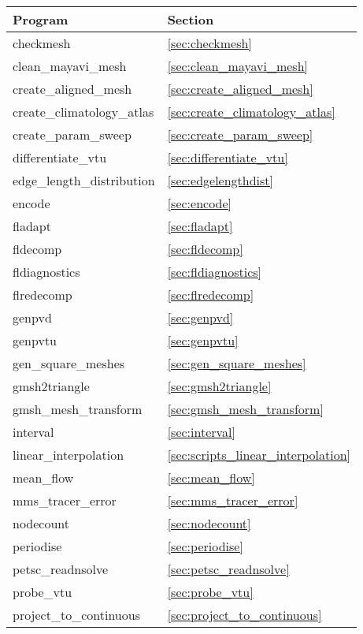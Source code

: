 \begin{table}
\begin{center}
  \begin{tabular}{| l | l |}
    \hline
	Program					& Section 				\\
    \hline
	checkmesh				& \ref{sec:checkmesh}			\\
    clean\_mayavi\_mesh       & \ref{sec:clean_mayavi_mesh} \\
	create\_aligned\_mesh 			& \ref{sec:create_aligned_mesh}	\\
	create\_climatology\_atlas		& \ref{sec:create_climatology_atlas}	\\
	create\_param\_sweep			& \ref{sec:create_param_sweep}		\\
	differentiate\_vtu          		& \ref{sec:differentiate_vtu}		\\
	edge\_length\_distribution		& \ref{sec:edgelengthdist} 		\\
	encode                  		& \ref{sec:encode} 	        	\\
	fladapt					& \ref{sec:fladapt}			\\
	fldecomp				& \ref{sec:fldecomp}			\\
	fldiagnostics				& \ref{sec:fldiagnostics}		\\
	flredecomp				& \ref{sec:flredecomp}			\\
	genpvd					& \ref{sec:genpvd} \\
	genpvtu					& \ref{sec:genpvtu}			\\
	gen\_square\_meshes			& \ref{sec:gen_square_meshes} 		\\
	gmsh2triangle				& \ref{sec:gmsh2triangle}		\\
	gmsh\_mesh\_transform			& \ref{sec:gmsh_mesh_transform}	\\
	interval				& \ref{sec:interval} 			\\
	linear\_interpolation			& \ref{sec:scripts_linear_interpolation} \\	
	mean\_flow				& \ref{sec:mean_flow}			\\
	mms\_tracer\_error			& \ref{sec:mms_tracer_error}		\\
	nodecount				& \ref{sec:nodecount}			\\
	periodise				& \ref{sec:periodise}			\\
	petsc\_readnsolve			& \ref{sec:petsc_readnsolve} 		\\
	probe\_vtu  				& \ref{sec:probe_vtu} 			\\
	project\_to\_continuous			& \ref{sec:project_to_continuous} 	\\

\end{tabular}
\end{center}
\end{table}
